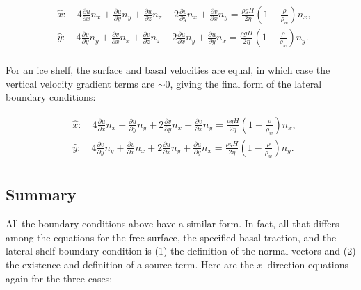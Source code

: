 \begin{equation}
\begin{split}
  & \hat{x}:\quad 4\frac{\partial u}{\partial x}n_{x}+\frac{\partial u}{\partial y}n_{y}+\frac{\partial u}{\partial z}n_{z}+2\frac{\partial v}{\partial y}n_{x}+\frac{\partial v}{\partial x}n_{y}=\frac{\rho gH}{2\eta }\left( 1-\frac{\rho }{\rho _{w}} \right)n_{x}, \\ 
 & \hat{y}:\quad 4\frac{\partial v}{\partial y}n_{y}+\frac{\partial v}{\partial x}n_{x}+\frac{\partial v}{\partial z}n_{z}+2\frac{\partial u}{\partial x}n_{y}+\frac{\partial u}{\partial y}n_{x}=\frac{\rho gH}{2\eta }\left( 1-\frac{\rho }{\rho _{w}} \right)n_{y}. \\ 
\end{split}
\end{equation}

For an ice shelf, the surface and basal velocities are equal, in which case the vertical velocity gradient terms are $\sim{0}$, giving the final form of the lateral boundary conditions:

\begin{equation}
\begin{split}
  & \hat{x}:\quad 4\frac{\partial u}{\partial x}n_{x}+\frac{\partial u}{\partial y}n_{y}+2\frac{\partial v}{\partial y}n_{x}+\frac{\partial v}{\partial x}n_{y}=\frac{\rho gH}{2\eta }\left( 1-\frac{\rho }{\rho _{w}} \right)n_{x}, \\ 
 & \hat{y}:\quad 4\frac{\partial v}{\partial y}n_{y}+\frac{\partial v}{\partial x}n_{x}+2\frac{\partial u}{\partial x}n_{y}+\frac{\partial u}{\partial y}n_{x}=\frac{\rho gH}{2\eta }\left( 1-\frac{\rho }{\rho _{w}} \right)n_{y}. \\ 
\end{split}
\end{equation}

\subsection{Summary}
All the boundary conditions above have a similar form. In fact, all that differs among the equations for the free surface, the specified basal traction, and the lateral shelf boundary condition is (1) the definition of the normal vectors and (2) the existence and definition of a source term. Here are the $x$--direction equations again for the three cases:

